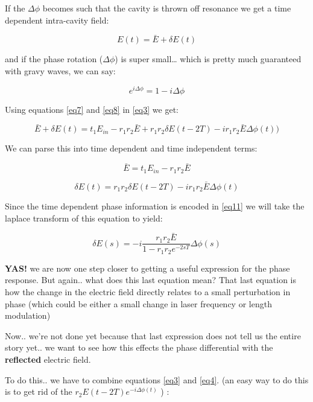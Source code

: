If the \(\Delta \phi\) becomes such that the cavity is thrown off
resonance we get a time dependent intra-cavity field:

\begin{equation} E(t) = \bar{E} + \delta E(t) \end{equation}

and if the phase rotation (\(\Delta \phi\)) is super small\ldots{} which
is pretty much guaranteed with gravy waves, we can say:

\begin{equation} e^{i\Delta \phi} = 1- i \Delta \phi \end{equation}

Using equations \ref{eq7} and \ref{eq8} in \ref{eq3} we get:

\begin{equation} \bar{E} + \delta E(t) = t_1 E_{in} -r_1r_2\bar{E} + r_1r_2 \delta E(t-2T) - ir_1r_2\bar{E}\Delta \phi(t)) \end{equation}

We can parse this into time dependent and time independent terms:

\begin{equation} \bar{E} = t_1 E_{in} -r_1r_2\bar{E} \end{equation}

\begin{equation} \delta E(t) = r_1r_2 \delta E(t-2T) - ir_1r_2\bar{E}\Delta \phi(t) \end{equation}

Since the time dependent phase information is encoded in \ref{eq11} we
will take the laplace transform of this equation to yield:

\begin{equation}\delta E(s) = -i \frac{r_1r_2 \bar{E}}{1-r_1r_2e^{-2sT}} \Delta \phi(s)\end{equation}

\textbf{YAS!} we are now one step closer to getting a useful expression
for the phase response. But again.. what does this last equation mean?
That last equation is how the change in the electric field directly
relates to a small perturbation in phase (which could be either a small
change in laser frequency or length modulation)

Now.. we're not done yet because that last expression does not tell us
the entire story yet.. we want to see how this effects the phase
differential with the \textbf{reflected} electric field.

To do this.. we have to combine equations \ref{eq3} and \ref{eq4}. (an
easy way to do this is to get rid of the $ r_2 E(t - 2T) e^{-i \Delta \phi(t)} $ ) :

